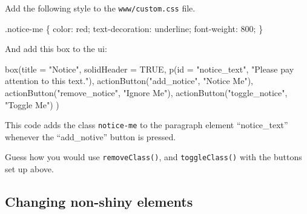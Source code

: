 \documentclass[
]{book}
\newenvironment{Shaded}{\begin{snugshade}}{\end{snugshade}}
\newcommand{\AttributeTok}[1]{\textcolor[rgb]{0.77,0.63,0.00}{#1}}
\newcommand{\ConstantTok}[1]{\textcolor[rgb]{0.00,0.00,0.00}{#1}}
\newcommand{\DecValTok}[1]{\textcolor[rgb]{0.00,0.00,0.81}{#1}}
\newcommand{\FunctionTok}[1]{\textcolor[rgb]{0.00,0.00,0.00}{#1}}
\newcommand{\NormalTok}[1]{#1}
\newcommand{\SpecialCharTok}[1]{\textcolor[rgb]{0.00,0.00,0.00}{#1}}
\newcommand{\StringTok}[1]{\textcolor[rgb]{0.31,0.60,0.02}{#1}}
\begin{document}
Add the following style to the \texttt{www/custom.css} file.

\begin{Shaded}
\begin{Highlighting}[]
\NormalTok{.notice}\SpecialCharTok{{-}}\NormalTok{me \{}
\NormalTok{  color}\SpecialCharTok{:}\NormalTok{ red;}
\NormalTok{  text}\SpecialCharTok{{-}}\NormalTok{decoration}\SpecialCharTok{:}\NormalTok{ underline;}
\NormalTok{  font}\SpecialCharTok{{-}}\NormalTok{weight}\SpecialCharTok{:} \DecValTok{800}\NormalTok{;}
\NormalTok{\}}
\end{Highlighting}
\end{Shaded}

And add this box to the ui:

\begin{Shaded}
\begin{Highlighting}[]
\FunctionTok{box}\NormalTok{(}\AttributeTok{title =} \StringTok{"Notice"}\NormalTok{, }\AttributeTok{solidHeader =} \ConstantTok{TRUE}\NormalTok{,}
    \FunctionTok{p}\NormalTok{(}\AttributeTok{id =} \StringTok{"notice\_text"}\NormalTok{, }\StringTok{"Please pay attention to this text."}\NormalTok{),}
    \FunctionTok{actionButton}\NormalTok{(}\StringTok{"add\_notice"}\NormalTok{, }\StringTok{"Notice Me"}\NormalTok{),}
    \FunctionTok{actionButton}\NormalTok{(}\StringTok{"remove\_notice"}\NormalTok{, }\StringTok{"Ignore Me"}\NormalTok{),}
    \FunctionTok{actionButton}\NormalTok{(}\StringTok{"toggle\_notice"}\NormalTok{, }\StringTok{"Toggle Me"}\NormalTok{)}
\NormalTok{)}
\end{Highlighting}
\end{Shaded}

This code adds the class \texttt{notice-me} to the paragraph element ``notice\_text'' whenever the ``add\_notive'' button is pressed.

\begin{Shaded}
\end{Shaded}

Guess how you would use \texttt{removeClass()}, and \texttt{toggleClass()} with the buttons set up above.

\hypertarget{changing-non-shiny-elements}{%
\subsection{Changing non-shiny elements}\label{changing-non-shiny-elements}}
\end{document}
